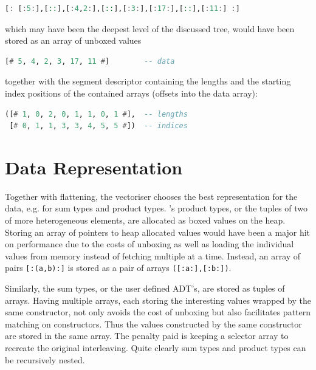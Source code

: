 \documentclass[preamble.tex]{subfiles}
\begin{document}
\begin{lstlisting}[basicstyle={\ttfamily},language=Haskell]
[: [:5:],[::],[:4,2:],[::],[:3:],[:17:],[::],[:11:] :]
\end{lstlisting}


which may have been the deepest level of the discussed tree, would have been stored as an array of unboxed values

\begin{lstlisting}[basicstyle={\ttfamily},language=Haskell]
[# 5, 4, 2, 3, 17, 11 #]        -- data
\end{lstlisting}


together with the segment descriptor containing the lengths and the starting index positions of the contained arrays (offsets into the data array):

\begin{lstlisting}[basicstyle={\ttfamily},language=Haskell]
([# 1, 0, 2, 0, 1, 1, 0, 1 #],  -- lengths
 [# 0, 1, 1, 3, 3, 4, 5, 5 #])  -- indices
\end{lstlisting}



\section{\label{sub:DPH-Data-Repr}Data Representation}

Together with flattening, the vectoriser chooses the best representation for the data, e.g. for sum types and product types. \Haskell's product types, or the tuples of two of more heterogeneous elements, are allocated as boxed values on the heap. Storing an array of pointers to heap allocated values would have been a major hit on performance due to the costs of unboxing as well as loading the individual values from memory instead of fetching multiple at a time. Instead, an array of pairs \texttt{{[}:(a,b):{]}} is stored as a pair of arrays \texttt{({[}:a:{]},{[}:b:{]})}.

Similarly, the sum types, or the user defined ADT's, are stored as tuples of arrays. Having multiple arrays, each storing the interesting values wrapped by the same constructor, not only avoids the cost of unboxing but also facilitates pattern matching on constructors. Thus the values constructed by the same constructor are stored in the same array. The penalty paid is keeping a selector array to recreate the original interleaving. Quite clearly sum types and product types can be recursively nested.%

\end{document}
